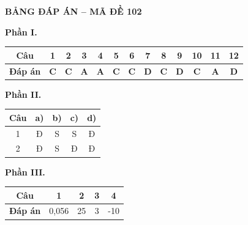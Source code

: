
\vspace{0.3cm}
\noindent\begin{minipage}{\linewidth}
\begin{center}{\large\bfseries\color{red!80!black} BẢNG ĐÁP ÁN -- MÃ ĐỀ 102}\end{center}
\noindent\textbf{Phần I.}\par\smallskip
\begin{center}\begin{tabular}{|c|c|c|c|c|c|c|c|c|c|c|c|c|}\hline
\textbf{Câu} & 1 & 2 & 3 & 4 & 5 & 6 & 7 & 8 & 9 & 10 & 11 & 12 \\ \hline
\textbf{Đáp án} & \textbf{C} & \textbf{C} & \textbf{A} & \textbf{A} & \textbf{C} & \textbf{C} & \textbf{D} & \textbf{C} & \textbf{D} & \textbf{C} & \textbf{A} & \textbf{D} \\ \hline
\end{tabular}\end{center}
\noindent\textbf{Phần II.}\par\smallskip
\begin{center}\begin{tabular}{|c|c|c|c|c|}\hline
\textbf{Câu} & \textbf{a)} & \textbf{b)} & \textbf{c)} & \textbf{d)} \\ \hline
1 & Đ & S & S & Đ \\ \hline
2 & Đ & S & Đ & Đ \\ \hline
\end{tabular}\end{center}
\noindent\textbf{Phần III.}\par\smallskip
\begin{center}\begin{tabular}{|c|c|c|c|c|}\hline
\textbf{Câu} & 1 & 2 & 3 & 4 \\ \hline
\textbf{Đáp án} & 0,056 & 25 & 3 & -10 \\ \hline
\end{tabular}\end{center}
\end{minipage}
